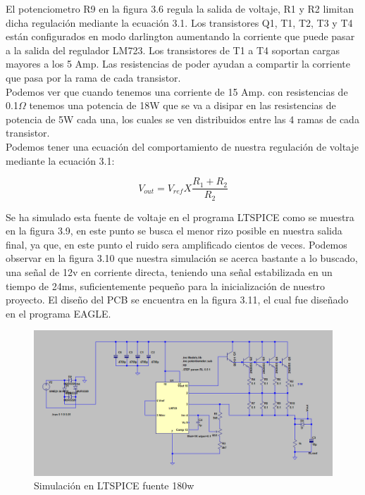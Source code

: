 El potenciometro R9 en la figura 3.6 regula la salida de voltaje, R1 y R2 limitan dicha regulación mediante la ecuación 3.1. Los transistores Q1, T1, T2, T3 y T4 están configurados en modo darlington aumentando la corriente que puede pasar a la salida del regulador LM723. Los transistores de T1 a T4 soportan cargas mayores a los 5 Amp. Las resistencias de poder ayudan a compartir la corriente que pasa por la rama de cada transistor. \\

Podemos ver que cuando tenemos una corriente de 15 Amp. con resistencias de 0.1$\Omega$ tenemos una potencia de 18W que se va a disipar en las resistencias de potencia de 5W cada una, los cuales se ven distribuidos entre las 4 ramas de cada transistor. \\

Podemos tener una ecuación del comportamiento de nuestra regulación de voltaje mediante la ecuación 3.1:

\begin{equation}\label{eq:ej}
V_{out}=V_{ref}X\dfrac{R_{1}+R_{2}}{R_{2}}
\end{equation}

Se ha simulado esta fuente de voltaje en el programa LTSPICE como se muestra en la figura 3.9, en este punto se busca el menor rizo posible en nuestra salida final, ya que, en este punto el ruido sera amplificado cientos de veces. Podemos observar en la figura 3.10 que nuestra simulación se acerca bastante a lo buscado, una señal de 12v en corriente directa, teniendo una señal estabilizada en un tiempo de 24ms, suficientemente pequeño para la inicialización de nuestro proyecto. El diseño del PCB se encuentra en la figura 3.11, el cual fue diseñado en el programa EAGLE.\\



\begin{figure}[H]
\centering
\includegraphics[width=12cm]{Capitulo3/figs/SIMFUENTE.png}
\caption{Simulación en LTSPICE fuente 180w}
\end{figure}




